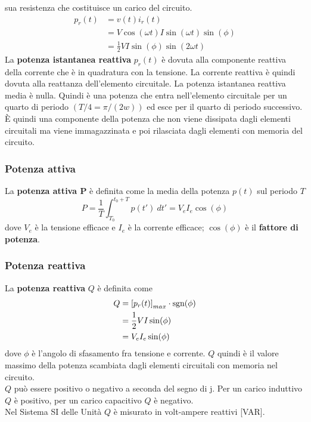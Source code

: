\documentclass{article}
\begin{document}
sua resistenza che costituisce un carico del
circuito.
\begin{align*}
    p_r(t) &= v(t)i_r(t)
    \\
    &= V \cos(\omega t)I \sin(\omega t)\sin(\phi)
    \\
    &= \frac{1}{2}VI\sin(\phi)\sin(2\omega t)
\end{align*}
La \textbf{potenza istantanea reattiva} $p_r(t)$ è dovuta
alla componente reattiva della corrente che è in
quadratura con la tensione. La corrente reattiva
è quindi dovuta alla reattanza dell'elemento circuitale. La potenza istantanea reattiva media è
nulla. Quindi è una potenza che entra nell'elemento circuitale per un quarto di periodo $(T/4 =\pi/(2w))$ ed esce per il quarto di periodo successivo. È quindi una componente della potenza
che non viene dissipata dagli elementi circuitali
ma viene immagazzinata e poi rilasciata dagli
elementi con memoria del circuito.

\subsubsection{Potenza attiva}
La \textbf{potenza attiva P} è definita come la media della potenza $p(t)$ sul periodo $T$
\[P = \frac{1}{T} \int_{T_0}^{t_0+T}p(t') \ dt' = V_eI_e\cos(\phi)\]
dove $V_e$ è la tensione efficace e $I_e$ è la corrente efficace; $\cos(\phi)$ è il \textbf{fattore di potenza}.

\subsubsection{Potenza reattiva}
La \textbf{potenza reattiva} $Q$ è definita come
\begin{align*}
    Q &= \left[p_r(t)\right]_{max} \cdot \text{sgn}(\phi)
    \\
    &=\frac{1}{2}VI\sin(\phi)
    \\
    &=V_eI_e \sin(\phi)
\end{align*}
dove $\phi$ è l'angolo di sfasamento fra tensione e corrente. $Q$ quindi è il valore massimo della potenza scambiata dagli elementi circuitali con memoria nel circuito.\\
$Q$ può essere positivo o negativo a seconda del segno di j. Per un carico induttivo $Q$ è positivo, per un carico capacitivo $Q$ è negativo.\\
Nel Sistema SI delle Unità $Q$ è misurato in volt-ampere reattivi [VAR].
\end{document}
